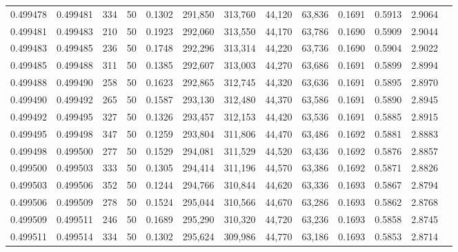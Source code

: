 \begin{tabular}{rrrrrrrrrrrrr}
0.499478 & 0.499481 & 334 &  50 &                                     0.1302 & 291,850 & 313,760 &  44,120 &  63,836 & 0.1691 & 0.5913 & 2.9064 \\
0.499481 & 0.499483 & 210 &  50 &                                     0.1923 & 292,060 & 313,550 &  44,170 &  63,786 & 0.1690 & 0.5909 & 2.9044 \\
0.499483 & 0.499485 & 236 &  50 &                                     0.1748 & 292,296 & 313,314 &  44,220 &  63,736 & 0.1690 & 0.5904 & 2.9022 \\
0.499485 & 0.499488 & 311 &  50 &                                     0.1385 & 292,607 & 313,003 &  44,270 &  63,686 & 0.1691 & 0.5899 & 2.8994 \\
0.499488 & 0.499490 & 258 &  50 &                                     0.1623 & 292,865 & 312,745 &  44,320 &  63,636 & 0.1691 & 0.5895 & 2.8970 \\
0.499490 & 0.499492 & 265 &  50 &                                     0.1587 & 293,130 & 312,480 &  44,370 &  63,586 & 0.1691 & 0.5890 & 2.8945 \\
0.499492 & 0.499495 & 327 &  50 &                                     0.1326 & 293,457 & 312,153 &  44,420 &  63,536 & 0.1691 & 0.5885 & 2.8915 \\
0.499495 & 0.499498 & 347 &  50 &                                     0.1259 & 293,804 & 311,806 &  44,470 &  63,486 & 0.1692 & 0.5881 & 2.8883 \\
0.499498 & 0.499500 & 277 &  50 &                                     0.1529 & 294,081 & 311,529 &  44,520 &  63,436 & 0.1692 & 0.5876 & 2.8857 \\
0.499500 & 0.499503 & 333 &  50 &                                     0.1305 & 294,414 & 311,196 &  44,570 &  63,386 & 0.1692 & 0.5871 & 2.8826 \\
0.499503 & 0.499506 & 352 &  50 &                                     0.1244 & 294,766 & 310,844 &  44,620 &  63,336 & 0.1693 & 0.5867 & 2.8794 \\
0.499506 & 0.499509 & 278 &  50 &                                     0.1524 & 295,044 & 310,566 &  44,670 &  63,286 & 0.1693 & 0.5862 & 2.8768 \\
0.499509 & 0.499511 & 246 &  50 &                                     0.1689 & 295,290 & 310,320 &  44,720 &  63,236 & 0.1693 & 0.5858 & 2.8745 \\
0.499511 & 0.499514 & 334 &  50 &                                     0.1302 & 295,624 & 309,986 &  44,770 &  63,186 & 0.1693 & 0.5853 & 2.8714 \\

\end{tabular}
